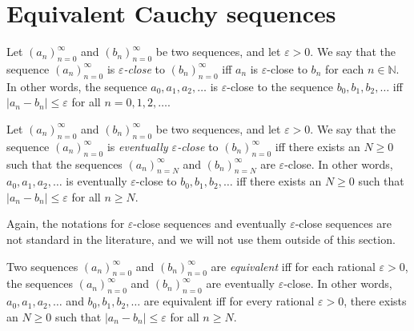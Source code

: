 \section{Equivalent Cauchy sequences}

\begin{definition}\label{5.2.1}
Let \((a_n)_{n = 0}^{\infty}\) and \((b_n)_{n = 0}^{\infty}\) be two sequences, and let \(\varepsilon > 0\).
We say that the sequence \((a_n)_{n = 0}^{\infty}\) is \emph{\(\varepsilon\)-close} to \((b_n)_{n = 0}^{\infty}\) iff \(a_n\) is \(\varepsilon\)-close to \(b_n\) for each \(n \in \mathds{N}\).
In other words, the sequence \(a_0, a_1, a_2, \dots\) is \(\varepsilon\)-close to the sequence \(b_0, b_1, b_2, \dots\) iff \(|a_n - b_n| \leq \varepsilon\) for all \(n = 0, 1, 2, \dots\).
\end{definition}

\setcounter{theorem}{2}
\begin{definition}\label{5.2.3}
Let \((a_n)_{n = 0}^{\infty}\) and \((b_n)_{n = 0}^{\infty}\) be two sequences, and let \(\varepsilon > 0\).
We say that the sequence \((a_n)_{n = 0}^{\infty}\) is \emph{eventually \(\varepsilon\)-close} to \((b_n)_{n = 0}^{\infty}\) iff there exists an \(N \geq 0\) such that the sequences \((a_n)_{n = N}^{\infty}\) and \((b_n)_{n = N}^{\infty}\) are \(\varepsilon\)-close.
In other words, \(a_0, a_1, a_2, \dots\) is eventually \(\varepsilon\)-close to \(b_0, b_1, b_2, \dots\) iff there exists an \(N \geq 0\) such that \(|a_n - b_n| \leq \varepsilon\) for all \(n \geq N\).
\end{definition}

\begin{remark}\label{5.2.4}
Again, the notations for \(\varepsilon\)-close sequences and eventually \(\varepsilon\)-close sequences are not standard in the literature, and we will not use them outside of this section.
\end{remark}

\setcounter{theorem}{5}
\begin{definition}\label{5.2.6}
Two sequences \((a_n)_{n = 0}^{\infty}\) and \((b_n)_{n = 0}^{\infty}\) are \emph{equivalent} iff for each rational \(\varepsilon > 0\), the sequences \((a_n)_{n = 0}^{\infty}\) and \((b_n)_{n = 0}^{\infty}\) are eventually \(\varepsilon\)-close.
In other words, \(a_0, a_1, a_2, \dots\) and \(b_0, b_1, b_2, \dots\) are equivalent iff for every rational \(\varepsilon > 0\), there exists an \(N \geq 0\) such that \(|a_n - b_n| \leq \varepsilon\) for all \(n \geq N\).
\end{definition}

